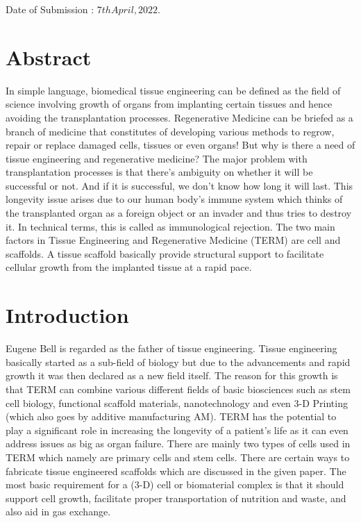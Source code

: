 \documentclass[12pt]{article}
\begin{document}
\raggedright
Date of Submission :  $7th  April, 2022.$
\clearpage

\centering
\section{Abstract}
\raggedright
\bigskip
\bigskip
In simple language, biomedical tissue engineering can be defined as the field of science involving growth of organs from implanting certain tissues and hence avoiding the transplantation processes. Regenerative Medicine can be briefed as a branch of medicine that constitutes of developing various methods to regrow, repair or replace damaged cells, tissues or even organs! But why is there a need of tissue engineering and regenerative medicine? The major problem with transplantation processes is that there's ambiguity on whether it will be successful or not. And if it is successful, we don't know how long it will last. This longevity issue arises due to our human body's immune system which thinks of the transplanted organ as a foreign object or an invader and thus tries to destroy it. In technical terms, this is called as immunological rejection. The two main factors in Tissue Engineering and Regenerative Medicine (TERM) are cell and scaffolds. A tissue scaffold basically provide structural support to facilitate cellular growth from the implanted tissue at a rapid pace.
\linebreak

\centering
\section{Introduction}
\raggedright
\bigskip
\bigskip
Eugene Bell is regarded as the father of tissue engineering. Tissue engineering basically started as a sub-field of biology but due to the advancements and rapid growth it was then declared as a new field itself. The reason for this growth is that TERM can combine various different fields of basic biosciences such as stem cell biology, functional scaffold materials, nanotechnology and even 3-D Printing (which also goes by additive manufacturing {AM}). TERM has the potential to play a significant role in increasing the longevity of a patient's life as it can even address issues as big as organ failure. There are mainly two types of cells used in TERM which namely are primary cells and stem cells. There are certain ways to fabricate tissue engineered scaffolds which are discussed in the given paper. The most basic requirement for a (3-D) cell or biomaterial complex is that it should support cell growth, facilitate proper transportation of nutrition and waste, and also aid in gas exchange.
\linebreak
\end{document}

